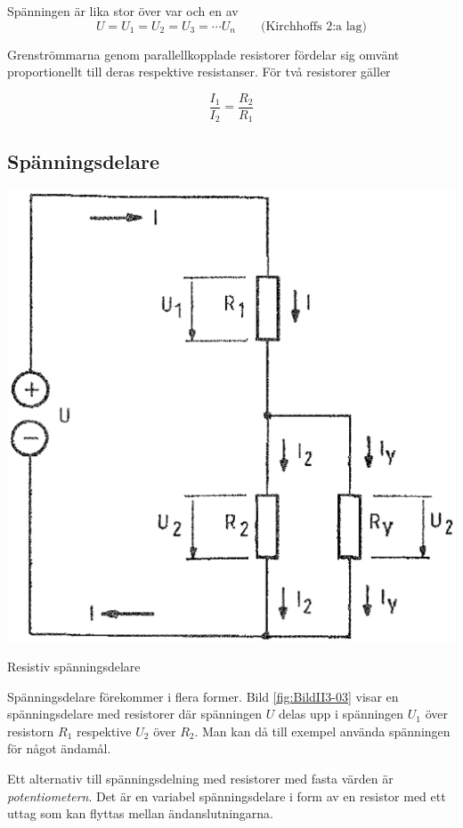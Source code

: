 Spänningen är lika stor över var och en av
\[  U = U_1 = U_2 = U_3 = \cdots U_n \qquad \text{(Kirchhoffs 2:a lag)} \]

Grenströmmarna genom parallellkopplade resistorer fördelar sig omvänt
proportionellt till deras respektive resistanser.
För två resistorer gäller

\[   \frac{I_1}{I_2} = \frac{R_2}{R_1}   \]

\subsection{Spänningsdelare}

\begin{marginfigure}%
  \includegraphics[width=\textwidth]{images/cropped_pdfs/bild_2_3-03.pdf}
  \caption{Resistiv spänningsdelare}
  \label{fig:BildII3-03}
\end{marginfigure}

Spänningsdelare förekommer i flera former.
Bild \ref{fig:BildII3-03} visar en spänningsdelare med resistorer där
spänningen \(U\) delas upp i spänningen \(U_1\) över resistorn \(R_1\)
respektive \(U_2\) över \(R_2\).
Man kan då till exempel använda spänningen för något ändamål.

Ett alternativ till spänningsdelning med resistorer med fasta värden är
\emph{potentiometern}. Det är en variabel spänningsdelare i form av en resistor
med ett uttag som kan flyttas mellan ändanslutningarna.

